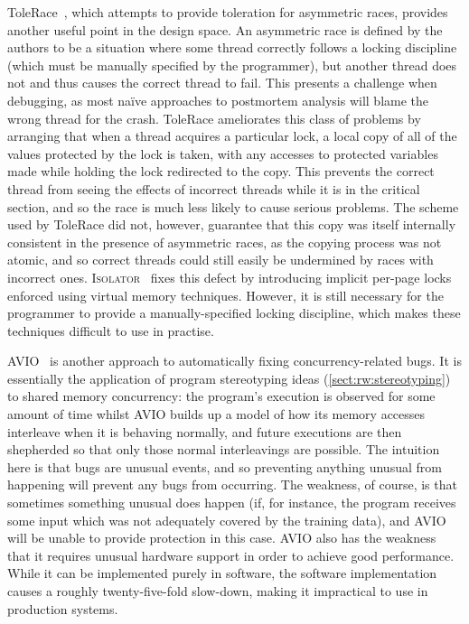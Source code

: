 ToleRace~\cite{Kirovski2007}, which attempts to provide toleration for
asymmetric races, provides another useful point in the design space.
An asymmetric race is defined by the authors to be a situation where
some thread correctly follows a locking discipline (which must be
manually specified by the programmer), but another thread does not and
thus causes the correct thread to fail.  This presents a challenge
when debugging, as most na\"{i}ve approaches to postmortem analysis
will blame the wrong thread for the crash.  ToleRace ameliorates this
class of problems by arranging that when a thread acquires a
particular lock, a local copy of all of the values protected by the
lock is taken, with any accesses to protected variables made while
holding the lock redirected to the copy.  This prevents the correct
thread from seeing the effects of incorrect threads while it is in the
critical section, and so the race is much less likely to cause serious
problems.  The scheme used by ToleRace did not, however, guarantee
that this copy was itself internally consistent in the presence of
asymmetric races, as the copying process was not atomic, and so
correct threads could still easily be undermined by races with
incorrect ones.  \textsc{Isolator}~\cite{Ramalingam2009} fixes this
defect by introducing implicit per-page locks enforced using virtual
memory techniques.  However, it is still necessary for the programmer
to provide a manually-specified locking discipline, which makes these
techniques difficult to use in practise.

AVIO~\cite{Lu} is another approach to automatically fixing
concurrency-related bugs.  It is essentially the application of
program stereotyping ideas (\autoref{sect:rw:stereotyping}) to shared
memory concurrency: the program's execution is observed for some
amount of time whilst AVIO builds up a model of how its memory
accesses interleave when it is behaving normally, and future
executions are then shepherded so that only those normal interleavings
are possible.  The intuition here is that bugs are unusual events, and
so preventing anything unusual from happening will prevent any bugs
from occurring.  The weakness, of course, is that sometimes something
unusual does happen (if, for instance, the program receives some input
which was not adequately covered by the training data), and AVIO will
be unable to provide protection in this case.  AVIO also has the
weakness that it requires unusual hardware support in order to achieve
good performance.  While it can be implemented purely in software, the
software implementation causes a roughly twenty-five-fold slow-down,
making it impractical to use in production systems.

